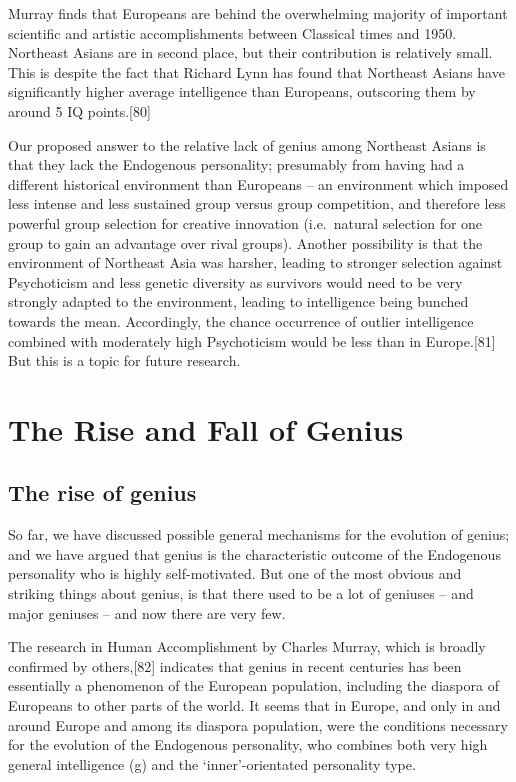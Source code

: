 \documentclass[
]{book}
\begin{document}
Murray finds that Europeans are behind the overwhelming majority of important scientific and artistic accomplishments between Classical times and 1950. Northeast Asians are in second place, but their contribution is relatively small. This is despite the fact that Richard Lynn has found that Northeast Asians have significantly higher average intelligence than Europeans, outscoring them by around 5 IQ points.{[}80{]}

Our proposed answer to the relative lack of genius among Northeast Asians is that they lack the Endogenous personality; presumably from having had a different historical environment than Europeans -- an environment which imposed less intense and less sustained group versus group competition, and therefore less powerful group selection for creative innovation (i.e.~natural selection for one group to gain an advantage over rival groups). Another possibility is that the environment of Northeast Asia was harsher, leading to stronger selection against Psychoticism and less genetic diversity as survivors would need to be very strongly adapted to the environment, leading to intelligence being bunched towards the mean. Accordingly, the chance occurrence of outlier intelligence combined with moderately high Psychoticism would be less than in Europe.{[}81{]} But this is a topic for future research.

\hypertarget{the-rise-and-fall-of-genius}{%
\chapter{The Rise and Fall of Genius}\label{the-rise-and-fall-of-genius}}

\hypertarget{the-rise-of-genius}{%
\section{The rise of genius}\label{the-rise-of-genius}}

So far, we have discussed possible general mechanisms for the evolution of genius; and we have argued that genius is the characteristic outcome of the Endogenous personality who is highly self-motivated. But one of the most obvious and striking things about genius, is that there used to be a lot of geniuses -- and major geniuses -- and now there are very few.

The research in Human Accomplishment by Charles Murray, which is broadly confirmed by others,{[}82{]} indicates that genius in recent centuries has been essentially a phenomenon of the European population, including the diaspora of Europeans to other parts of the world. It seems that in Europe, and only in and around Europe and among its diaspora population, were the conditions necessary for the evolution of the Endogenous personality, who combines both very high general intelligence (g) and the `inner'-orientated personality type.
\end{document}
